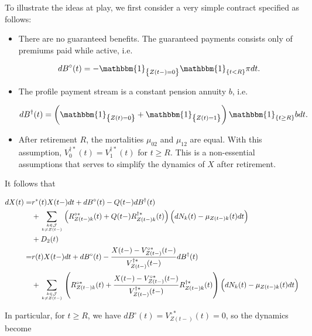 \documentclass{book}
\newcommand{\1}[1]{\mathbbm{1}_{\left\lbrace #1 \right\rbrace}}
\theoremstyle{break}
\theoremstyle{remark}
\numberwithin{equation}{section}
\begin{document}
\begin{example}

To illustrate the ideas at play, we first consider a very simple contract specified as follows:

\begin{itemize}
	\item There are no guaranteed benefits. The guaranteed payments consists only of premiums paid while active, i.e.
	
	\begin{align*}
		dB^\circ(t) = - \1{Z(t-)=0} \1{t < R} \pi dt.
	\end{align*}
	
	\item The profile payment stream is a constant pension annuity $b$, i.e.
	
	\begin{align*}
		dB^\dagger(t) = \left( \1{Z(t)=0} + \1{Z(t)=1} \right) \1{t \geq R} b dt.
	\end{align*}

	\item After retirement $R$, the mortalities $\mu_{02}$ and $\mu_{12}$ are equal. With this assumption, $V_{0}^{\dagger*}(t)=V_{1}^{\dagger*}(t)$ for $t \geq R$. This is a non-essential assumptions that serves to simplify the dynamics of $X$ after retirement.
\end{itemize}

It follows that
	
\begin{align*}
	dX(t) =& r^*(t) X(t-) dt + dB^\circ(t) - Q(t-) dB^\dagger(t) \\
	&+ \sum_{k \in \mathcal{J} \atop k \neq Z(t-)} \left( R_{Z(t-)k}^{\circ*}(t) + Q(t-) R_{Z(t-)k}^{\dagger*}(t) \right) \left( dN_k(t) - \mu_{Z(t-)k}(t) dt \right) \\
	&+ D_2(t) \\
	=& r(t) X(t-) dt + dB^\circ(t) - \frac{X(t-) - V_{Z(t-)}^{\circ*}(t-)}{V_{Z(t-)}^{\dagger*}(t-)} dB^\dagger(t) \\
	&+ \sum_{k \in \mathcal{J} \atop k \neq Z(t-)} \left( R_{Z(t-)k}^{\circ*}(t) + \frac{X(t-) - V_{Z(t-)}^{\circ*}(t-)}{V_{Z(t-)}^{\dagger*}(t-)} R_{Z(t-)k}^{\dagger*}(t) \right) \left( dN_k(t) - \mu_{Z(t-)k}(t) dt \right) \\
\end{align*}

In particular, for $t \geq R$, we have $dB^\circ(t) =  V_{Z(t-)}^{\circ*}(t)= 0$, so the dynamics become


\end{example}
\end{document}
